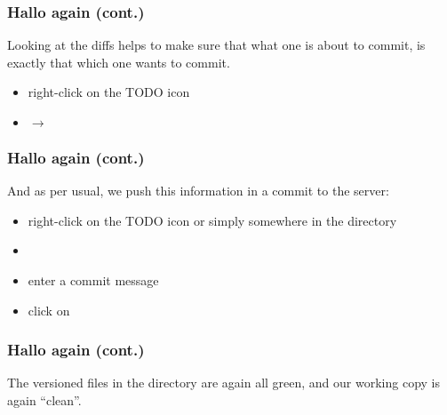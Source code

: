 \begin{frame}[fragile]
    \frametitle{Hallo again (cont.)}

    Looking at the diffs helps to make sure that what one is about to commit, is
    exactly that which one wants to commit.
    \begin{itemize}
        \item right-click on the TODO icon
        \item {} $\rightarrow$ 
    \end{itemize}
    \begin{center}
    \end{center}

\end{frame}

\begin{frame}[fragile]
    \frametitle{Hallo again (cont.)}

    And as per usual, we push this information in a commit to the server:
    \begin{itemize}
        \item right-click on the TODO icon or simply somewhere in the
            directory
        \item {}
        \item enter a commit message
        \item click on 
    \end{itemize}
    \begin{center}
    \end{center}

\end{frame}

\begin{frame}[fragile]
    \frametitle{Hallo again (cont.)}

    The versioned files in the directory are again all green, and our
    working copy is again \enquote{clean}.
    \begin{center}
    \end{center}

\end{frame}

